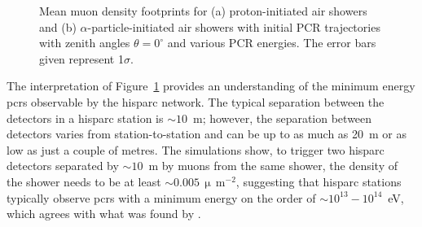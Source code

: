 \begin{figure}[ht!]
	\centering
	\qquad
	\caption{Mean muon density footprints for (a) proton-initiated air showers and (b) $\alpha$-particle-initiated air showers with initial PCR trajectories with zenith angles $\theta=0^{\circ}$ and various PCR energies. The error bars given represent 1$\sigma$.} \label{fig:shower_footprints}
\end{figure}

The interpretation of Figure~\ref{fig:shower_footprints} provides an understanding of the minimum energy \glspl{pcr} observable by the \gls{hisparc} network. The typical separation between the detectors in a \gls{hisparc} station is $\sim 10$~m; however, the separation between detectors varies from station-to-station and can be up to as much as 20~m or as low as just a couple of metres. The simulations show, to trigger two \gls{hisparc} detectors separated by $\sim 10$~m by muons from the same shower, the density of the shower needs to be at least $\sim 0.005 \, \upmu \, \mathrm{m}^{-2}$, suggesting that \gls{hisparc} stations typically observe \glspl{pcr} with a minimum energy on the order of $\sim 10^{13} - 10^{14}$~eV, which agrees with what was found by \cite{van_dam_hisparc_2020}.

